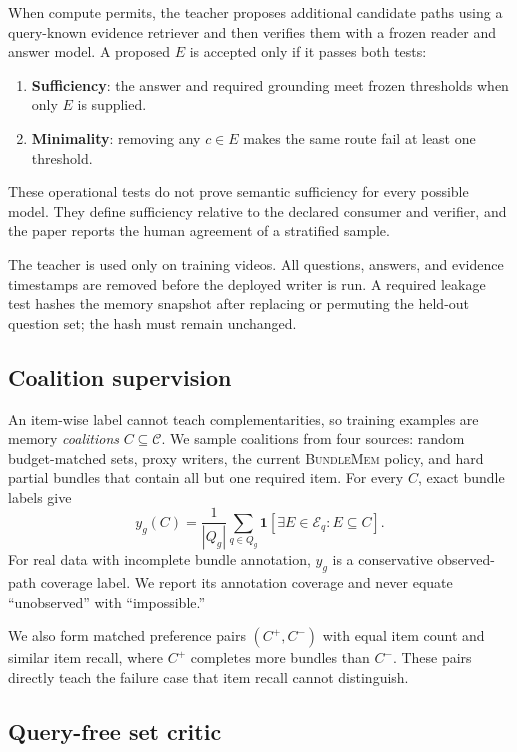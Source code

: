 \documentclass[10pt,twocolumn,letterpaper]{article}
\newcommand{\method}{\textnormal{\textsc{BundleMem}}\xspace}
\begin{document}
When compute permits, the teacher proposes additional candidate paths using a query-known evidence retriever and then verifies them with a frozen reader and answer model.
A proposed $E$ is accepted only if it passes both tests:
\begin{enumerate}[leftmargin=*,itemsep=1pt]
    \item \textbf{Sufficiency}: the answer and required grounding meet frozen thresholds when only $E$ is supplied.
    \item \textbf{Minimality}: removing any $c\in E$ makes the same route fail at least one threshold.
\end{enumerate}
These operational tests do not prove semantic sufficiency for every possible model.
They define sufficiency relative to the declared consumer and verifier, and the paper reports the human agreement of a stratified sample.

The teacher is used only on training videos.
All questions, answers, and evidence timestamps are removed before the deployed writer is run.
A required leakage test hashes the memory snapshot after replacing or permuting the held-out question set; the hash must remain unchanged.

\subsection{Coalition supervision}

An item-wise label cannot teach complementarities, so training examples are memory \emph{coalitions} $C\subseteq\mathcal C$.
We sample coalitions from four sources: random budget-matched sets, proxy writers, the current \method policy, and hard partial bundles that contain all but one required item.
For every $C$, exact bundle labels give
\begin{equation}
    y_g(C)=\frac{1}{|Q_g|}\sum_{q\in Q_g}\mathbf{1}[\exists E\in\mathcal E_q:E\subseteq C].
    \label{eq:coalitionlabel}
\end{equation}
For real data with incomplete bundle annotation, $y_g$ is a conservative observed-path coverage label.
We report its annotation coverage and never equate ``unobserved'' with ``impossible.''

We also form matched preference pairs $(C^+,C^-)$ with equal item count and similar item recall, where $C^+$ completes more bundles than $C^-$.
These pairs directly teach the failure case that item recall cannot distinguish.

\subsection{Query-free set critic}
\end{document}
